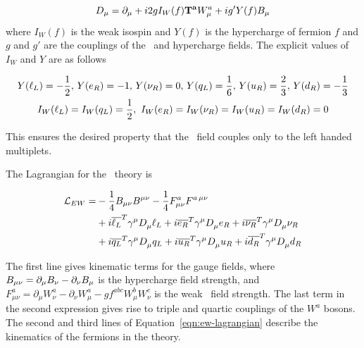 \begin{equation}
D_{\mu}  =  \partial_{\mu} + i2gI_{W}(f)\mathbf{T^{a}} W_{\mu}^{a} + ig'Y(f)B_{\mu}
\label{eqn:ew-covariant-derivative}
\end{equation}
where $I_{W}(f)$ is the weak isospin and $Y(f)$ is the
hypercharge of fermion $f$ and $g$ and $g'$ are the couplings of the \sutwo\ and
hypercharge fields. The explicit values of $I_{W}$ and $Y$ are as
follows

\begin{gather}
Y(\ell_{L}) = - \frac{1}{2},\, Y(e_{R}) = - 1,\, Y(\nu_{R}) =0,\, Y(q_{L}) = \frac{1}{6},\,
Y(u_{R}) = \frac{2}{3},\, Y(d_{R}) = - \frac{1}{3} \notag\\
I_{W}(\ell_{L}) = I_{W}(q_{L}) = \frac{1}{2}, \  I_{W}(e_{R}) = I_{W}(\nu_{R}) =  I_{W}(u_{R}) = I_{W}(d_{R}) = 0 
\label{eqn:hypercharges}
\end{gather}

This ensures the desired property that the \sutwo\ field
couples only to the left handed multiplets. 

The Lagrangian for the \ew\ theory is

\begin{align}
\mathcal{L}_{EW}  = & - \frac{1}{4} B_{\mu\nu} B^{\mu\nu} - \frac{1}{4} F^{a}_{\mu\nu}
F^{a\,\mu\nu} \notag \\
& +  i \overline{\ell_{L}}^{T} \gamma^{\mu} D_{\mu}^{} \ell_{L} + i  \overline{e_{R}}^{T} \gamma^{\mu}
D_{\mu}^{} e_{R} + i \overline{\nu_{R}}^{T} \gamma^{\mu} D_{\mu}^{} \nu_{R} \notag \\
& +  i \overline{q_{L}}^{T} \gamma^{\mu} D_{\mu}^{} q_{L} + i  \overline{u_R}^{T} \gamma^{\mu}
D_{\mu}^{} u_R + i \overline{d_R}^{T} \gamma^{\mu} D_{\mu}^{} d_{R} 
\label{eqn:ew-lagrangian}
\end{align}

The first line gives kinematic terms for the gauge fields, where $ B_{\mu\nu} =
\partial_{\mu} B_{\nu} - \partial_{\nu} B_{\mu}$ is the hypercharge field strength,
and  $ F^{a}_{\mu\nu} =
\partial_{\mu} W^{a}_{\nu} - \partial_{\nu} W^{a}_{\mu} - g f^{abc} W^{b}_{\mu}
W^{c}_{\nu}$ is the weak \sutwo\ field strength. The last term in the second
expression gives rise to triple and quartic couplings of the $W^{a}$ bosons. 
The second and third lines of Equation~\ref{eqn:ew-lagrangian} describe the
kinematics of the fermions in the theory. 


